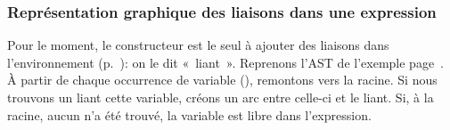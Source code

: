 %
\begin{frame}
\frametitle{Représentation graphique des liaisons dans une expression}
\label{binding_sample}

Pour le moment, le constructeur  est le seul à ajouter des
liaisons dans l'environnement
(p.~\pageref{semantique_operationnelle_etendue_lisible}): on le dit
«~liant~». Reprenons l'AST de l'exemple
page~\pageref{un_exemple_complexe}. À partir de chaque occurrence de
variable (), remontons vers la racine. Si nous trouvons un
 liant cette variable, créons un arc entre celle-ci et le
 liant. Si, à la racine, aucun  n'a été trouvé,
la variable est libre dans l'expression.
{\small
\begin{center}
\end{center}
}

\end{frame}


